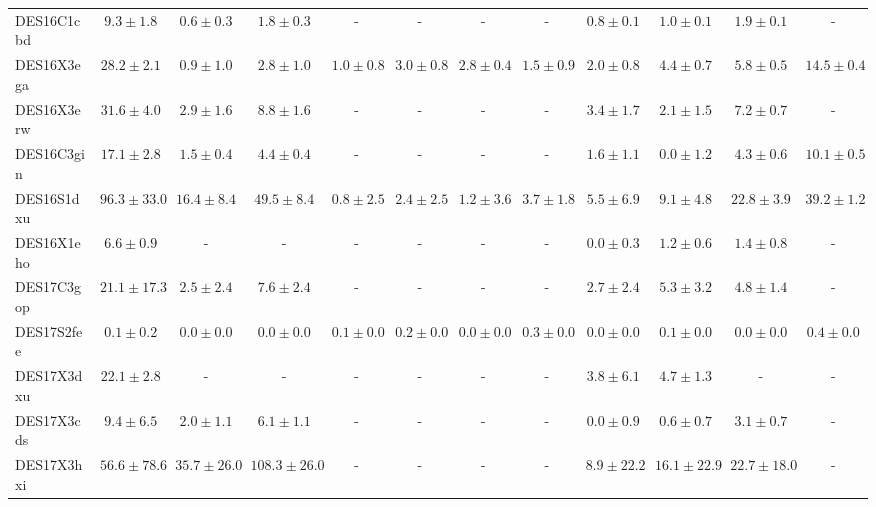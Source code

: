 \documentclass[fleqn,usenatbib,]{mnras}
\begin{document}
\begin{table}
\begin{tabular}{lccccccccccc}
DES16C1cbd &    $9.3 \pm 1.8$ &    $0.6 \pm 0.3$ &     $1.8 \pm 0.3$ &               - &               - &               - &               - &   $0.8 \pm 0.1$ &    $1.0 \pm 0.1$ &    $1.9 \pm 0.1$ &                - \\
DES16X3ega &   $28.2 \pm 2.1$ &    $0.9 \pm 1.0$ &     $2.8 \pm 1.0$ &   $1.0 \pm 0.8$ &   $3.0 \pm 0.8$ &   $2.8 \pm 0.4$ &   $1.5 \pm 0.9$ &   $2.0 \pm 0.8$ &    $4.4 \pm 0.7$ &    $5.8 \pm 0.5$ &   $14.5 \pm 0.4$ \\
DES16X3erw &   $31.6 \pm 4.0$ &    $2.9 \pm 1.6$ &     $8.8 \pm 1.6$ &               - &               - &               - &               - &   $3.4 \pm 1.7$ &    $2.1 \pm 1.5$ &    $7.2 \pm 0.7$ &                - \\
DES16C3gin &   $17.1 \pm 2.8$ &    $1.5 \pm 0.4$ &     $4.4 \pm 0.4$ &               - &               - &               - &               - &   $1.6 \pm 1.1$ &    $0.0 \pm 1.2$ &    $4.3 \pm 0.6$ &   $10.1 \pm 0.5$ \\
DES16S1dxu &  $96.3 \pm 33.0$ &   $16.4 \pm 8.4$ &    $49.5 \pm 8.4$ &   $0.8 \pm 2.5$ &   $2.4 \pm 2.5$ &   $1.2 \pm 3.6$ &   $3.7 \pm 1.8$ &   $5.5 \pm 6.9$ &    $9.1 \pm 4.8$ &   $22.8 \pm 3.9$ &   $39.2 \pm 1.2$ \\
DES16X1eho &    $6.6 \pm 0.9$ &                - &                 - &               - &               - &               - &               - &   $0.0 \pm 0.3$ &    $1.2 \pm 0.6$ &    $1.4 \pm 0.8$ &                - \\
DES17C3gop &  $21.1 \pm 17.3$ &    $2.5 \pm 2.4$ &     $7.6 \pm 2.4$ &               - &               - &               - &               - &   $2.7 \pm 2.4$ &    $5.3 \pm 3.2$ &    $4.8 \pm 1.4$ &                - \\
DES17S2fee &    $0.1 \pm 0.2$ &    $0.0 \pm 0.0$ &     $0.0 \pm 0.0$ &   $0.1 \pm 0.0$ &   $0.2 \pm 0.0$ &   $0.0 \pm 0.0$ &   $0.3 \pm 0.0$ &   $0.0 \pm 0.0$ &    $0.1 \pm 0.0$ &    $0.0 \pm 0.0$ &    $0.4 \pm 0.0$ \\
DES17X3dxu &   $22.1 \pm 2.8$ &                - &                 - &               - &               - &               - &               - &   $3.8 \pm 6.1$ &    $4.7 \pm 1.3$ &                - &                - \\
DES17X3cds &    $9.4 \pm 6.5$ &    $2.0 \pm 1.1$ &     $6.1 \pm 1.1$ &               - &               - &               - &               - &   $0.0 \pm 0.9$ &    $0.6 \pm 0.7$ &    $3.1 \pm 0.7$ &                - \\
DES17X3hxi &  $56.6 \pm 78.6$ &  $35.7 \pm 26.0$ &  $108.3 \pm 26.0$ &               - &               - &               - &               - &  $8.9 \pm 22.2$ &  $16.1 \pm 22.9$ &  $22.7 \pm 18.0$ &                - \\

\end{tabular}
\end{table}
\end{document}

